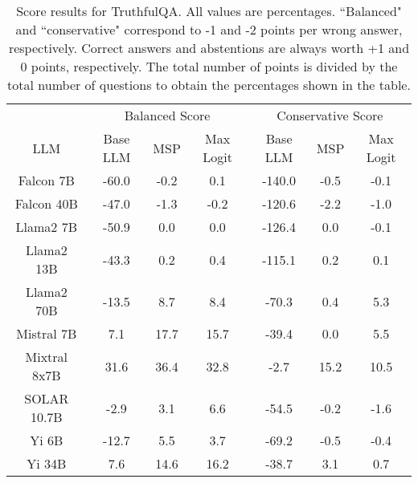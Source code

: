 \begin{table*}
\centering
\begin{tabular}{c|c|c|c|c|c|c}
& \multicolumn{3}{c|}{Balanced Score} & \multicolumn{3}{c}{Conservative Score} \\ 
LLM & Base LLM & MSP & Max Logit & Base LLM & MSP & Max Logit\\ \hline
Falcon 7B & -60.0 & -0.2 & 0.1 & -140.0 & -0.5 & -0.1\\
Falcon 40B & -47.0 & -1.3 & -0.2 & -120.6 & -2.2 & -1.0\\
Llama2 7B & -50.9 & 0.0 & 0.0 & -126.4 & 0.0 & -0.1\\
Llama2 13B & -43.3 & 0.2 & 0.4 & -115.1 & 0.2 & 0.1\\
Llama2 70B & -13.5 & 8.7 & 8.4 & -70.3 & 0.4 & 5.3\\
Mistral 7B & 7.1 & 17.7 & 15.7 & -39.4 & 0.0 & 5.5\\
Mixtral 8x7B & 31.6 & 36.4 & 32.8 & -2.7 & 15.2 & 10.5\\
SOLAR 10.7B & -2.9 & 3.1 & 6.6 & -54.5 & -0.2 & -1.6\\
Yi 6B & -12.7 & 5.5 & 3.7 & -69.2 & -0.5 & -0.4\\
Yi 34B & 7.6 & 14.6 & 16.2 & -38.7 & 3.1 & 0.7\\
\hline
\end{tabular}
\caption{Score results for TruthfulQA. All values are percentages. ``Balanced" and ``conservative" correspond to -1 and -2 points per wrong answer, respectively. Correct answers and abstentions are always worth +1 and 0 points, respectively. The total number of points is divided by the total number of questions to obtain the percentages shown in the table.}
\label{tab:truthfulqa_score}
\end{table*}
